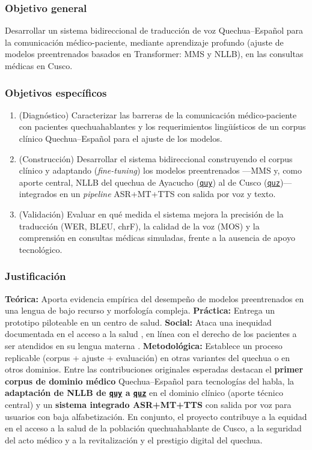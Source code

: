 \documentclass[12pt,a4paper]{article}
\newcommand{\nuevo}[1]{#1}
\DeclareRobustCommand{\sig}[1]{\hyperlink{sig:#1}{\texttt{#1}}}
\begin{document}
\subsubsection{Objetivo general}
\nuevo{Desarrollar un sistema bidireccional de traducci{\'o}n de voz Quechua--Espa{\~n}ol para la
comunicaci{\'o}n m{\'e}dico-paciente, mediante aprendizaje profundo (ajuste de modelos preentrenados
basados en Transformer: MMS y NLLB), en las consultas m{\'e}dicas en Cusco.}

\subsubsection{Objetivos espec{\'i}ficos}
\begin{enumerate}
  \item \nuevo{(Diagn{\'o}stico) Caracterizar las barreras de la comunicaci{\'o}n m{\'e}dico-paciente con pacientes quechuahablantes y los requerimientos ling{\"u}{\'i}sticos de un corpus cl{\'i}nico Quechua--Espa{\~n}ol para el ajuste de los modelos.}
  \item \nuevo{(Construcci{\'o}n) Desarrollar el sistema bidireccional construyendo el corpus cl{\'i}nico y adaptando (\emph{fine-tuning}) los modelos preentrenados ---MMS y, como aporte central, NLLB del quechua de Ayacucho (\sig{quy}) al de Cusco (\sig{quz})--- integrados en un \emph{pipeline} ASR+MT+TTS con salida por voz y texto.}
  \item \nuevo{(Validaci{\'o}n) Evaluar en qu{\'e} medida el sistema mejora la precisi{\'o}n de la traducci{\'o}n (WER, BLEU, chrF), la calidad de la voz (MOS) y la comprensi{\'o}n en consultas m{\'e}dicas simuladas, frente a la ausencia de apoyo tecnol{\'o}gico.}
\end{enumerate}

\subsubsection{Justificaci{\'o}n}
\textbf{Te{\'o}rica:} Aporta evidencia emp{\'i}rica del desempe{\~n}o de modelos preentrenados en una
lengua de bajo recurso y morfolog{\'i}a compleja. \textbf{Pr{\'a}ctica:} Entrega un prototipo
piloteable en un centro de salud. \textbf{Social:} Ataca una inequidad documentada en el acceso a la
salud \parencite{begazo2026}, en l{\'i}nea con el derecho de los pacientes a ser atendidos en su
lengua materna \parencite{essalud2023}. \textbf{Metodol{\'o}gica:} Establece un proceso replicable
(corpus + ajuste + evaluaci{\'o}n) en otras variantes del quechua o en otros dominios. Entre las
contribuciones originales esperadas destacan el \textbf{primer corpus de dominio m{\'e}dico}
Quechua--Espa{\~n}ol para tecnolog{\'i}as del habla, la \textbf{adaptaci{\'o}n de NLLB de
\sig{quy} a \sig{quz}} en el dominio cl{\'i}nico (aporte t{\'e}cnico central) y un
\textbf{sistema integrado ASR+MT+TTS} con salida por voz para usuarios con baja alfabetizaci{\'o}n.
En conjunto, el proyecto contribuye a la equidad en el acceso a la salud de la poblaci{\'o}n
quechuahablante de Cusco, a la seguridad del acto m{\'e}dico y a la revitalizaci{\'o}n y el prestigio
digital del quechua.
\end{document}
